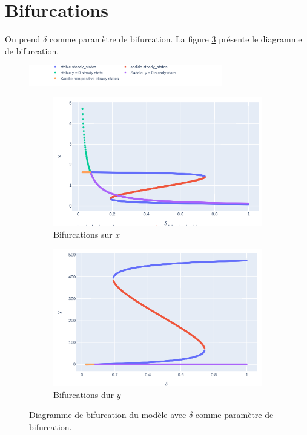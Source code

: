 \documentclass[12pt]{article}
\begin{document}
\section{Bifurcations}
On prend $\delta$ comme paramètre de bifurcation. La figure \ref{fig::bifurcations} présente le diagramme de bifurcation.
\begin{figure}[!ht]
    \centering
    \includegraphics[width=0.75\textwidth]{figures/fig_bifurcation_legend.png}
    \begin{subfigure}[b]{0.49\textwidth}
         \centering
         \includegraphics[width=\textwidth]{figures/fig_bifurcation_x.png}
         \caption{Bifurcations sur $x$}
         \label{fig::bifurcations_x}
     \end{subfigure}
     \hfill
    \begin{subfigure}[b]{0.49\textwidth}
         \centering
         \includegraphics[width=\textwidth]{figures/fig_bifurcation_y.png}
         \caption{Bifurcations dur $y$}
         \label{fig::bifurcations_y}
     \end{subfigure}
    \caption{Diagramme de bifurcation du modèle avec $\delta$ comme paramètre de bifurcation.}
    \label{fig::bifurcations}
\end{figure}
\end{document}
